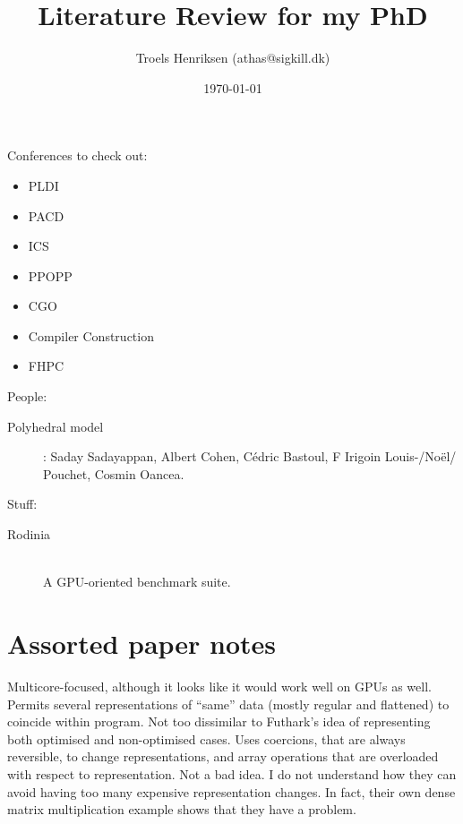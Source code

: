 \documentclass[a4paper, oneside, final]{memoir}
\title{Literature Review for my PhD}
\author{Troels Henriksen (athas@sigkill.dk)}
\date{\today}
\begin{document}
\frontmatter

\maketitle

Conferences to check out:

\begin{itemize}
\item PLDI
\item PACD
\item ICS
\item PPOPP
\item CGO
\item Compiler Construction
\item FHPC
\end{itemize}

People:

\begin{description}
\item[Polyhedral model]: Saday Sadayappan, Albert Cohen, Cédric
  Bastoul, F Irigoin Louis-/Noël/ Pouchet, Cosmin Oancea.
\end{description}

Stuff:

\begin{description}
\item[Rodinia]\hfill\\ A GPU-oriented benchmark suite.
\end{description}

\section*{Assorted paper notes}

\begin{quote}
\end{quote}

Multicore-focused, although it looks like it would work well on GPUs
as well.  Permits several representations of ``same'' data (mostly
regular and flattened) to coincide within program.  Not too dissimilar
to Futhark's idea of representing both optimised and non-optimised
cases.  Uses coercions, that are always reversible, to change
representations, and array operations that are overloaded with respect
to representation.  Not a bad idea.  I do not understand how they can
avoid having too many expensive representation changes.  In fact,
their own dense matrix multiplication example shows that they have a
problem.
\end{document}
